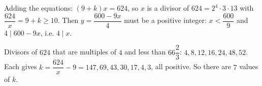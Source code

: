 Adding the equations: $(9+k)x=624$, so $x$ is a divisor of $624=2^4\cdot3\cdot13$ with $\dfrac{624}x=9+k\ge10$. Then $y=\dfrac{600-9x}4$ must be a positive integer: $x<\dfrac{600}9$ and $4\mid600-9x$, i.e. $4\mid x$.

Divisors of $624$ that are multiples of $4$ and less than $66\dfrac23$: $4,8,12,16,24,48,52$. Each gives $k=\dfrac{624}x-9=147,69,43,30,17,4,3$, all positive. So there are $\boxed{7}$ values of $k$.
